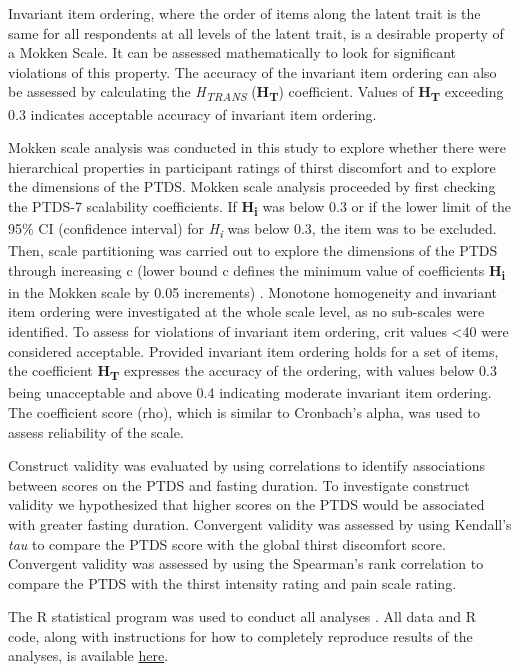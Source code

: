 \documentclass[12pt,twocolumn,twoside,]{pinp}
\begin{document}
Invariant item ordering, where the order of items along the latent trait
is the same for all respondents at all levels of the latent trait, is a
desirable property of a Mokken Scale. It can be assessed mathematically
to look for significant violations of this property. The accuracy of the
invariant item ordering can also be assessed by calculating the
\emph{H\textsubscript{TRANS}} (\textbf{H\textsubscript{T}}) coefficient.
Values of \textbf{H\textsubscript{T}} exceeding 0.3 indicates acceptable
accuracy of invariant item ordering.

Mokken scale analysis was conducted in this study to explore whether
there were hierarchical properties in participant ratings of thirst
discomfort and to explore the dimensions of the PTDS. Mokken scale
analysis proceeded by first checking the PTDS-7 scalability
coefficients. If \textbf{H\textsubscript{i}} was below 0.3 or if the
lower limit of the 95\% CI (confidence interval) for
\emph{H\textsubscript{i}} was below 0.3, the item was to be excluded.
Then, scale partitioning was carried out to explore the dimensions of
the PTDS through increasing c (lower bound c defines the minimum value
of coefficients \textbf{H\textsubscript{i}} in the Mokken scale by 0.05
increments) \citep{molenaar2000mps5}. Monotone homogeneity and invariant
item ordering were investigated at the whole scale level, as no
sub-scales were identified. To assess for violations of invariant item
ordering, crit values \textless40 were considered
acceptable.\citep{molenaar2000mps5} Provided invariant item ordering
holds for a set of items, the coefficient \textbf{H\textsubscript{T}}
expresses the accuracy of the ordering, with values below 0.3 being
unacceptable and above 0.4 indicating moderate invariant item
ordering.\citep{Ligtvoet_2010} The coefficient score (rho), which is
similar to Cronbach's alpha, was used to assess reliability of the
scale.

Construct validity was evaluated by using correlations to identify
associations between scores on the PTDS and fasting duration. To
investigate construct validity we hypothesized that higher scores on the
PTDS would be associated with greater fasting duration. Convergent
validity was assessed by using Kendall's \emph{tau} to compare the PTDS
score with the global thirst discomfort score. Convergent validity was
assessed by using the Spearman's rank correlation to compare the PTDS
with the thirst intensity rating and pain scale rating.

The R statistical program was used to conduct all analyses
\citep{rcore2020}. All data and R code, along with instructions for how
to completely reproduce results of the analyses, is available
\href{https://github.com/awconway/ptds}{here}.
\end{document}
